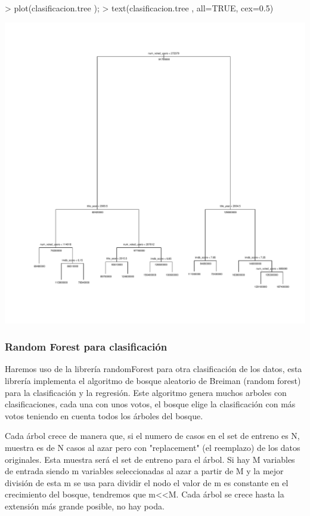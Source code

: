 \documentclass[a4paper]{article}
\begin{document}
\begin{Schunk}
\begin{Sinput}
> plot(clasificacion.tree );  
> text(clasificacion.tree , all=TRUE, cex=0.5)
\end{Sinput}
\end{Schunk}
\includegraphics{practica-3-tree}

\subsubsection{Random Forest para clasificación}
Haremos uso de la librería randomForest para otra clasificación de los datos, esta librería implementa el algoritmo de bosque aleatorio de Breiman (random forest) para la clasificación y la regresión. Este algoritmo genera muchos arboles con clasificaciones, cada una con unos votos, el bosque elige la clasificación con más votos teniendo en cuenta todos los árboles del bosque. 

Cada árbol crece de manera que, si el numero de casos en el set de entreno es N, muestra es de N casos al azar pero con "replacement" (el reemplazo) de los datos originales. Esta muestra será el set de entreno para el árbol. Si hay M variables de entrada siendo m variables seleccionadas al azar a partir de M y la mejor división de esta m se usa para dividir el nodo
el valor de m es constante en el crecimiento del bosque, tendremos que m<<M. Cada árbol se crece hasta la extensión más grande posible, no hay poda. 
\end{document}
